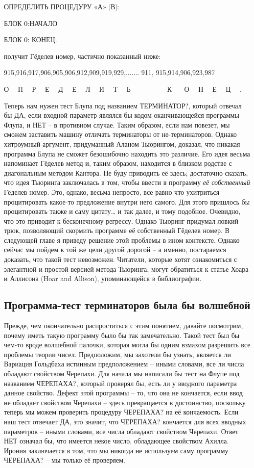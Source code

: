 \documentclass[../main.tex]{subfiles}
\begin{document}
ОПРЕДЕЛИТЬ ПРОЦЕДУРУ «А» {[}В{]}:

БЛОК 0:НАЧАЛО

БЛОК 0: КОНЕЦ.

получит Гёделев номер, частично показанный ниже:

915,916,917,906,905,906,912,909,919,929,....... 911, 915,914,906,923,987

О~~ П~~ Р~~ Е~~ Д~~ Е~~ Л~~ И~~ Т~~ Ь~~~~~~~~~~ К~~~ О~~ Н~~ Е~~ Ц~~ .

Теперь нам нужен тест Блупа под названием ТЕРМИНАТОР?, который отвечал бы ДА, если входной параметр являлся бы кодом оканчивающейся программы Флупа, и НЕТ \--- в противном случае. Таким образом, если нам повезет, мы сможем заставить машину отличать терминаторы от не-терминаторов. Однако хитроумный аргумент, придуманный Аланом Тьюрингом, доказал, что никакая программа Блупа не сможет безошибочно находить это различие. Его идея весьма напоминает Гёделев метод и, таким образом, находится в близком родстве с диагональным методом Кантора. Не буду приводить её здесь; достаточно сказать, что идея Тьюринга заключалась в том, чтобы ввести в программу \emph{её собственный} Гёделев номер. Это, однако, весьма непросто, все равно что ухитриться процитировать какое-то предложение внутри него самого. Для этого пришлось бы процитировать также и саму цитату\ldots{} и так далее, и тому подобное. Очевидно, что это приводит к бесконечному регрессу. Однако Тьюринг придумал ловкий трюк, позволяющий скормить программе её собственный Гёделев номер. В следующей главе я приведу решение этой проблемы в ином контексте. Однако сейчас мы пойдем к той же цели другой дорогой \--- а именно, постараемся доказать, что такой тест невозможен. Читатели, которые хотят ознакомиться с элегантной и простой версией метода Тьюринга, могут обратиться к статье Хоара и Аллисона (Hoar and Allison), упоминающейся в библиографии.


\subsection{Программа-тест терминаторов была бы волшебной}

Прежде, чем окончательно распроститься с этим понятием, давайте посмотрим, почему иметь такую программу было бы так замечательно. Такой тест был бы чем-то вроде волшебной палочки, которая могла бы одним взмахом разрешить все проблемы теории чисел. Предположим, мы захотели бы узнать, является ли Вариация Гольдбаха истинным предположением \--- иными словами, все ли числа обладают свойством Черепахи. Для начала мы написали бы тест на Флупе под названием ЧЕРЕПАХА?, который проверял бы, есть ли у вводного параметра данное свойство. Дефект этой программы \--- то, что она не кончается, если ввод не обладает свойством Черепахи \--- здесь превращается в достоинство, поскольку теперь мы можем проверить процедуру ЧЕРЕПАХА? на её кончаемость. Если наш тест отвечает ДА, это значит, что ЧЕРЕПАХА? кончается для всех вводных параметров \--- иными словами, все числа обладают свойством Черепахи. Ответ НЕТ означал бы, что имеется некое число, обладающее свойством Ахилла. Ирония заключается в том, что мы никогда не используем саму программу ЧЕРЕПАХА? \--- мы только её проверяем.
\end{document}
